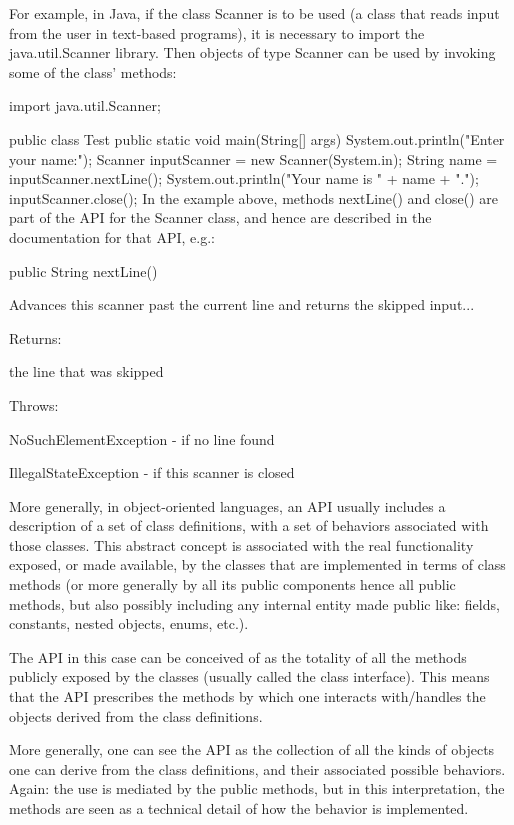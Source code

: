 For example, in Java, if the class Scanner is to be used (a class that reads input from the user in text-based programs), it is necessary to import the java.util.Scanner library. 
Then objects of type Scanner can be used by invoking some of the class' methods:

import java.util.Scanner;

public class Test {
	public static void main(String[] args) {
		System.out.println("Enter your name:");
		Scanner inputScanner = new Scanner(System.in);
		String name = inputScanner.nextLine();
		System.out.println("Your name is " + name + ".");
		inputScanner.close();
	}
}
In the example above, methods nextLine() and close() are part of the API for the Scanner class, and hence are described in the documentation for that API, e.g.:

public String nextLine()

Advances this scanner past the current line and returns the skipped input...

Returns:

the line that was skipped

Throws:

NoSuchElementException - if no line found

IllegalStateException - if this scanner is closed

More generally, in object-oriented languages, an API usually includes a description of a set of class definitions, with a set of behaviors associated with those classes. 
This abstract concept is associated with the real functionality exposed, or made available, by the classes that are implemented in terms of class methods (or more generally by all its public components hence all public methods, but also possibly including any internal entity made public like: fields, constants, nested objects, enums, etc.).

The API in this case can be conceived of as the totality of all the methods publicly exposed by the classes (usually called the class interface). 
This means that the API prescribes the methods by which one interacts with/handles the objects derived from the class definitions.

More generally, one can see the API as the collection of all the kinds of objects one can derive from the class definitions, and their associated possible behaviors. 
Again: the use is mediated by the public methods, but in this interpretation, the methods are seen as a technical detail of how the behavior is implemented.


